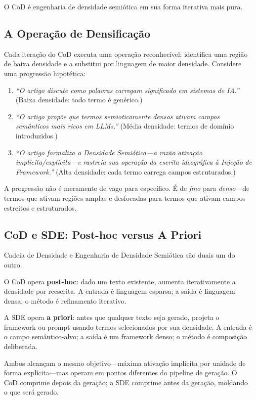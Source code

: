 \documentclass[12pt,a4paper]{article}
\begin{document}
O CoD é engenharia de densidade semiótica em sua forma iterativa mais pura.

\subsection{A Operação de Densificação}

Cada iteração do CoD executa uma operação reconhecível: identifica uma região de baixa densidade e a substitui por linguagem de maior densidade.
Considere uma progressão hipotética:

\begin{enumerate}
  \item \textit{``O artigo discute como palavras carregam significado em sistemas de IA.''} (Baixa densidade: todo termo é genérico.)
  \item \textit{``O artigo propõe que termos semioticamente densos ativam campos semânticos mais ricos em LLMs.''} (Média densidade: termos de domínio introduzidos.)
  \item \textit{``O artigo formaliza a Densidade Semiótica---a razão ativação implícita/explícita---e rastreia sua operação da escrita ideográfica à Injeção de Framework.''} (Alta densidade: cada termo carrega campos estruturados.)
\end{enumerate}

A progressão não é meramente de vago para específico.
É de \textit{fino} para \textit{denso}---de termos que ativam regiões amplas e desfocadas para termos que ativam campos estreitos e estruturados.

\subsection{CoD e SDE: Post-hoc versus A Priori}

Cadeia de Densidade e Engenharia de Densidade Semiótica são duais um do outro.

O CoD opera \textbf{post-hoc}: dado um texto existente, aumenta iterativamente a densidade por reescrita.
A entrada é linguagem esparsa; a saída é linguagem densa; o método é refinamento iterativo.

A SDE opera \textbf{a priori}: antes que qualquer texto seja gerado, projeta o framework ou prompt usando termos selecionados por sua densidade.
A entrada é o campo semântico-alvo; a saída é um framework denso; o método é composição deliberada.

Ambos alcançam o mesmo objetivo---máxima ativação implícita por unidade de forma explícita---mas operam em pontos diferentes do pipeline de geração.
O CoD comprime depois da geração; a SDE comprime antes da geração, moldando o que será gerado.
\end{document}
